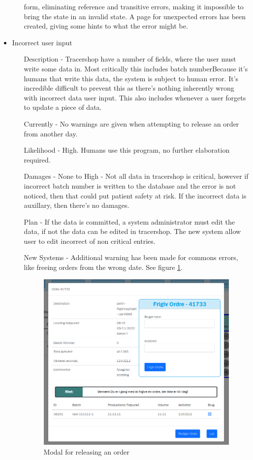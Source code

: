 \documentclass{article}
\begin{document}
\begin{itemize}
\begin{itemize}
    form, eliminating reference and transitive errors, making it impossible to
    bring the state in an invalid state. A page for unexpected errors has been
    created, giving some hints to what the error might be.
  \end{itemize}
  \item Incorrect user input
  \begin{itemize}
    \item[Description] - Tracershop have a number of fields, where the user must
    write some data in. Most critically this includes batch numberBecause it's
    humans that write this data, the system is subject to human error.
    It's incredible difficult to prevent this as there's nothing inherently
    wrong with \gls{incorrect data} user input. This also includes whenever a
    user forgets to update a piece of data.
    \item[Currently] - No warnings are given when attempting to release an order
    from another day.
    \item[Likelihood] - High. Humans use this program, no further
    elaboration required.
    \item[Damages] - None to High - Not all data in tracershop is critical,
    however if incorrect batch number is written to the database and the error
    is not noticed, then that could put patient safety at risk. If the incorrect
    data is auxillary, then there's no damages.
    \item[Plan] - If the data is committed, a system administrator must edit the
    data, if not the data can be edited in tracershop. The new system allow user
    to edit incorrect of non critical entries.
    \item[New Systems] - Additional warning has been made for commons errors,
    like freeing orders from the wrong date. See figure \ref{fig:dayhint}.

    \begin{figure}[ht]
      \begin{center}
        \includegraphics[width=0.6\linewidth]{figures/DayHint.png}
      \end{center}
      \caption{Modal for releasing an order}
      \label{fig:dayhint}
    \end{figure}


\end{itemize}
\end{itemize}
\end{document}
